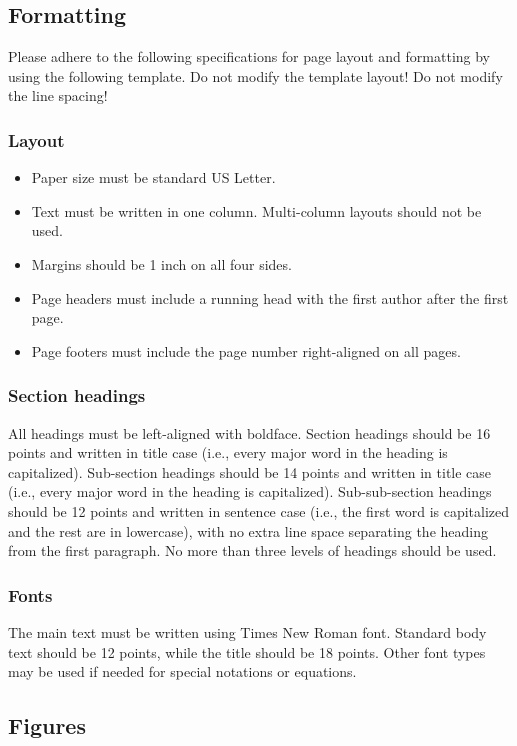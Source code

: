 \documentclass[12pt]{article}
\begin{document}
\subsection{Formatting}

Please adhere to the following specifications for page layout and formatting by using the following template. Do not modify the template layout! Do not modify the line spacing!

\subsubsection{Layout}
\begin{itemize}[noitemsep]
    \item Paper size must be standard US Letter.
    \item Text must be written in one column. Multi-column layouts should not be used.
    \item Margins should be 1 inch on all four sides.
    \item Page headers must include a running head with the first author after the first page. 
    \item Page footers must include the page number right-aligned on all pages. 
\end{itemize}

\subsubsection{Section headings}
All headings must be left-aligned with boldface. Section headings should be 16 points and written in title case (i.e., every major word in the heading is capitalized). Sub-section headings should be 14 points and written in title case (i.e., every major word in the heading is capitalized). Sub-sub-section headings should be 12 points and written in sentence case (i.e., the first word is capitalized and the rest are in lowercase), with no extra line space separating the heading from the first paragraph. No more than three levels of headings should be used.

\subsubsection{Fonts}
The main text must be written using Times New Roman font. Standard body text should be 12 points, while the title should be 18 points. Other font types may be used if needed for special notations or equations.

\subsection{Figures}
\end{document}
